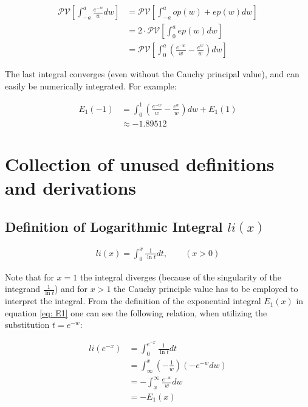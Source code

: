 \documentclass[bibliography=totocnumbered]{scrartcl}
\newcommand{\assume}[1][\text{MISSING PARAMETER}]{,\qquad\left(#1\right)}
\begin{document}
	\begin{align}
		\mathcal{PV}\left[\int_{-a}^{a}\frac{e^{-w}}{w}dw\right]&=\mathcal{PV}\left[\int_{-a}^{a}op\left(w\right)+ep\left(w\right)dw\right]\\
		&=2\cdot\mathcal{PV}\left[\int_{0}^{a}ep\left(w\right)dw\right]\\
		&=\mathcal{PV}\left[\int_{0}^{a}\left(\frac{e^{-w}}{w}-\frac{e^w}{w}\right)dw\right]
	\end{align}

	The last integral converges (even without the Cauchy principal value), and can easily be numerically integrated. For example:
	
	\begin{align}
		E_1\left(-1\right)&=\int_{0}^{1}\left(\frac{e^{-w}}{w}-\frac{e^w}{w}\right)dw+E_1\left(1\right)\\
		&\approx-1.89512
	\end{align}

	\clearpage
	\printbibliography
	\clearpage
	\appendix

	\section{Collection of unused definitions and derivations}

		\subsection[Definition of Logarithmic Integral]{Definition of Logarithmic Integral $li\left(x\right)$}
		\label{appsubsec: li}

			\begin{gather}
				li\left(x\right)=\int_{0}^{x}\frac{1}{\ln{t}}dt\assume[x>0]\label{eq: li}
			\end{gather}

			Note that for $x=1$ the integral diverges (because of the singularity of the integrand $\frac{1}{\ln{t}}$) and for $x>1$ the Cauchy principle value has to be employed to interpret the integral. From the definition of the exponential integral $E_1\left(x\right)$ in equation \eqref{eq: E1} one can see the following relation, when utilizing the substitution $t=e^{-w}$:

			\begin{align}
				li\left(e^{-x}\right)&=\int_{0}^{e^{-x}}\frac{1}{\ln{t}}dt\\
				&=\int_{\infty}^{x}\left(-\frac{1}{w}\right)\left(-e^{-w}dw\right)\\
				&=-\int_{x}^{\infty}\frac{e^{-w}}{w}dw\\
				&=-E_1\left(x\right)
			\end{align}
\end{document}
